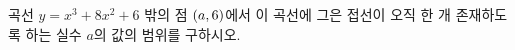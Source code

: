 곡선 $y=x^3+8x^2+6$ 밖의 점 $(a{,}\mkern3mu\mathopen{}6)$에서 이 곡선에 그은 접선이 오직 한 개 존재하도록 하는 실수 $a$의 값의 범위를 구하시오. 
